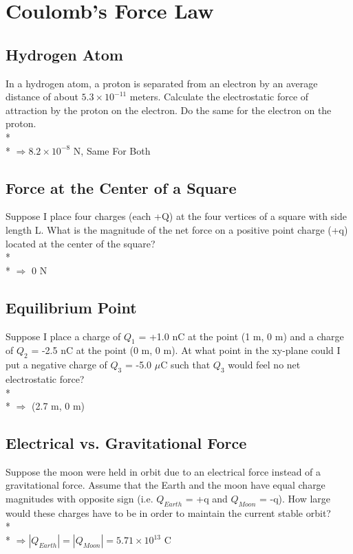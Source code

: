 \documentclass[11pt]{article}
\begin{document}
\pagebreak
\section{Coulomb's Force Law}
\vspace{10pt}

\subsection{Hydrogen Atom}
In a hydrogen atom, a proton is separated from an electron by an average distance of about $5.3 \times 10^{-11}$ meters.  Calculate the electrostatic force of attraction by the proton on the electron.  Do the same for the electron on the proton. \\* \\*
$\Rightarrow 8.2 \times 10^{-8}$ N, Same For Both

\subsection{Force at the Center of a Square}
Suppose I place four charges (each +Q) at the four vertices of a square with side length L.  What is the magnitude of the net force on a positive point charge (+q) located at the center of the square? \\* \\*
$\Rightarrow$ 0 N

\subsection{Equilibrium Point}
Suppose I place a charge of $Q_1$ = +1.0 nC at the point (1 m, 0 m) and a charge of $Q_2$ = -2.5 nC at the point (0 m, 0 m).  At what point in the xy-plane could I put a negative charge of $Q_3$ = -5.0 $\mu$C such that $Q_3$ would feel no net electrostatic force? \\* \\*
$\Rightarrow$ (2.7 m, 0 m)

\subsection{Electrical vs. Gravitational Force}
Suppose the moon were held in orbit due to an electrical force instead of a gravitational force.  Assume that the Earth and the moon have equal charge magnitudes with opposite sign (i.e. $Q_{Earth}$ = +q and $Q_{Moon}$ = -q).  How large would these charges have to be in order to maintain the current stable orbit? \\* \\*
$\Rightarrow |Q_{Earth}| = |Q_{Moon}| = 5.71\times10^{13}$ C
\end{document}
